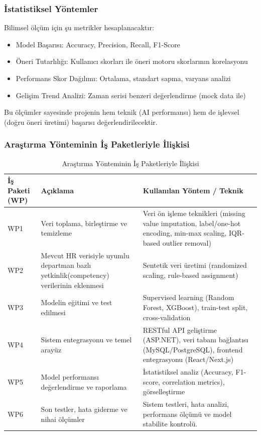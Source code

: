 \documentclass[a4paper,12pt]{article}
\begin{document}
\subsubsection*{İstatistiksel Yöntemler}
\noindent Bilimsel ölçüm için şu metrikler hesaplanacaktır:

\begin{itemize}
    \item Model Başarısı: Accuracy, Precision, Recall, F1-Score \cite{han2011data}
    \item Öneri Tutarlılığı: Kullanıcı skorları ile öneri motoru skorlarının korelasyonu
    \item Performans Skor Dağılımı: Ortalama, standart sapma, varyans analizi \cite{montgomery2017design}
    \item Gelişim Trend Analizi: Zaman serisi benzeri değerlendirme (mock data ile)
\end{itemize}

\noindent Bu ölçümler sayesinde projenin hem teknik (AI performansı) hem de işlevsel (doğru öneri üretimi) başarısı değerlendirilecektir.


\subsubsection*{Araştırma Yönteminin İş Paketleriyle İlişkisi}

\begin{table}[h!]
\centering
\renewcommand{\arraystretch}{1.3} %
\begin{tabular}{|p{3cm}|p{6cm}|p{7cm}|}
\hline
\textbf{İş Paketi (WP)} & \textbf{Açıklama} & \textbf{Kullanılan Yöntem / Teknik} \\ \hline
WP1 & Veri toplama, birleştirme ve temizleme & Veri ön işleme teknikleri (missing value imputation, label/one-hot encoding, min-max scaling, IQR-based outlier removal) \\ \hline
WP2 & Mevcut HR verisiyle uyumlu departman bazlı yetkinlik(competency) verilerinin eklenmesi & Sentetik veri üretimi (randomized scaling, rule-based assignment) \\ \hline
WP3 & Modelin eğitimi ve test edilmesi & Supervised learning (Random Forest, XGBoost), train-test split, cross-validation \\ \hline
WP4 & Sistem entegrasyonu ve temel arayüz & RESTful API geliştirme (ASP.NET), veri tabanı bağlantısı (MySQL/PostgreSQL), frontend entegrasyonu (React/Next.js) \\ \hline
WP5 & Model performansı değerlendirme ve raporlama  & İstatistiksel analiz (Accuracy, F1-score, correlation metrics), görselleştirme \\ \hline
WP6 & Son testler, hata giderme ve nihai ölçümler & Sistem testleri, hata analizi, performans ölçümü ve model stabilite kontrolü. \\ \hline
\end{tabular}
\caption{Araştırma Yönteminin İş Paketleriyle İlişkisi}
\label{tab:is_paketi_iliski}
\end{table}
\end{document}
